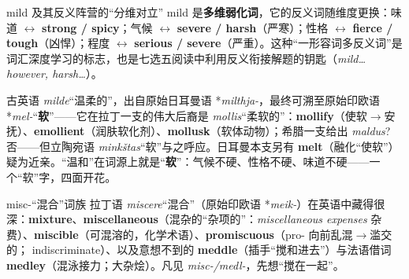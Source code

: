 \documentclass[../main.tex]{subfiles}
\begin{document}
\begin{gram}{mild 及其反义阵营的“分维对立”}
mild 是\textbf{多维弱化词}，它的反义词随维度更换：味道 $\leftrightarrow$ \textbf{strong / spicy}；气候 $\leftrightarrow$ \textbf{severe / harsh}（严寒）；性格 $\leftrightarrow$ \textbf{fierce / tough}（凶悍）；程度 $\leftrightarrow$ \textbf{serious / severe}（严重）。这种“一形容词多反义词”是词汇深度学习的标志，也是七选五阅读中利用反义衔接解题的钥匙（\textit{mild\dots however, harsh\dots}）。
\end{gram}

\begin{origin}
古英语 \textit{milde}“温柔的”，出自原始日耳曼语 *\textit{milthja-}，最终可溯至原始印欧语 *\textit{mel-}“\textbf{软}”——它在拉丁一支的伟大后裔是 \textit{mollis}“柔软的”：\textbf{mollify}（使软$\to$安抚）、\textbf{emollient}（润肤软化剂）、\textbf{mollusk}（软体动物）；希腊一支给出 \textit{maldus}? 否——但立陶宛语 \textit{minkštas}“软”与之呼应。日耳曼本支另有 \textbf{melt}（融化“使软”）疑为近亲。“温和”在词源上就是“\textbf{软}”：气候不硬、性格不硬、味道不硬——一个“软”字，四面开花。
\end{origin}



\begin{gram}{misc-“混合”词族}
拉丁语 \textit{miscere}“混合”（原始印欧语 *\textit{meik-}）在英语中藏得很深：\textbf{mixture}、\textbf{miscellaneous}（混杂的“杂项的”：\textit{miscellaneous expenses} 杂费）、\textbf{miscible}（可混溶的，化学术语）、\textbf{promiscuous}（pro- 向前乱混$\to$滥交的； indiscriminate）、以及意想不到的 \textbf{meddle}（插手“搅和进去”）与法语借词 \textbf{medley}（混泳接力；大杂烩）。凡见 \textit{misc-/medl-}，先想“搅在一起”。
\end{gram}


\end{document}
